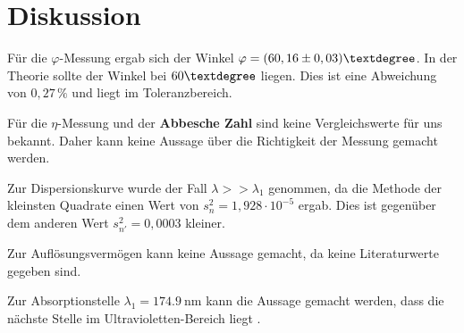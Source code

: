 \section{Diskussion}
Für die $\varphi$-Messung ergab sich der Winkel $\varphi = (60,16\pm0,03)\textdegree$.
In der Theorie sollte der Winkel bei $60 \textdegree$ liegen. Dies ist eine Abweichung
von $0,27 \, \%$ und liegt im Toleranzbereich.\newline

Für die $\eta$-Messung und der \textbf{Abbesche Zahl} sind keine Vergleichswerte
für uns bekannt. Daher kann keine Aussage über die Richtigkeit der Messung gemacht werden.\newline

Zur Dispersionskurve wurde der Fall $\lambda >> \lambda_1$ genommen, da die
Methode der kleinsten Quadrate einen Wert von $s^2_{n} = 1,928 \cdot 10^{-5}$ ergab. Dies
ist gegenüber dem anderen Wert $s^2_{n'} = 0,0003$ kleiner.\newline

Zur Auflösungsvermögen kann keine Aussage gemacht, da keine Literaturwerte gegeben sind.

Zur Absorptionstelle $\lambda_1 = \SI{174,9}{\nano\meter}$ kann die Aussage gemacht werden, dass die
nächste Stelle im Ultravioletten-Bereich\cite{2} liegt .
